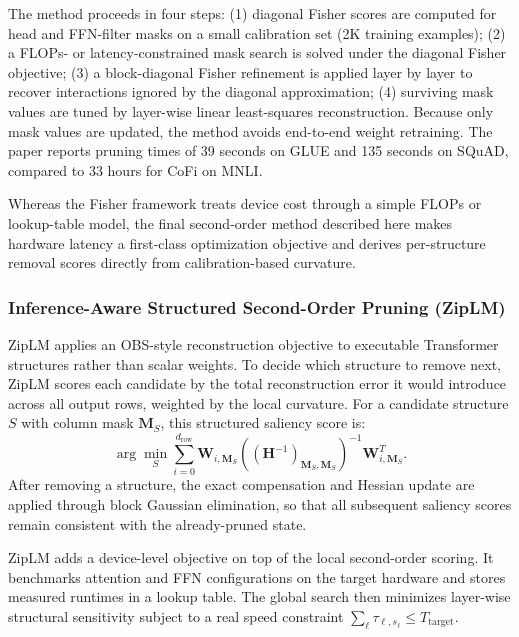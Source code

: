 The method proceeds in four steps: (1) diagonal Fisher scores are computed for head and FFN-filter masks on a small calibration set (2K training examples); (2) a FLOPs- or latency-constrained mask search is solved under the diagonal Fisher objective; (3) a block-diagonal Fisher refinement is applied layer by layer to recover interactions ignored by the diagonal approximation; (4) surviving mask values are tuned by layer-wise linear least-squares reconstruction. Because only mask values are updated, the method avoids end-to-end weight retraining. The paper reports pruning times of 39 seconds on GLUE and 135 seconds on SQuAD, compared to 33 hours for CoFi on MNLI.

Whereas the Fisher framework treats device cost through a simple FLOPs or lookup-table model, the final second-order method described here makes hardware latency a first-class optimization objective and derives per-structure removal scores directly from calibration-based curvature.

\subsubsection{Inference-Aware Structured Second-Order Pruning (ZipLM)}

ZipLM \cite{kurtic2023ziplm} applies an OBS-style reconstruction objective to executable Transformer structures rather than scalar weights. To decide which structure to remove next, ZipLM scores each candidate by the total reconstruction error it would introduce across all output rows, weighted by the local curvature. For a candidate structure $S$ with column mask $\mathbf{M}_S$, this structured saliency score is:
\begin{equation}
	\arg\min_S
	\sum_{i=0}^{d_{\text{row}}}
	\mathbf{W}_{i,\mathbf{M}_S}
	\left(\left(\mathbf{H}^{-1}\right)_{\mathbf{M}_S,\mathbf{M}_S}\right)^{-1}
	\mathbf{W}_{i,\mathbf{M}_S}^{T}.
\end{equation}
After removing a structure, the exact compensation and Hessian update are applied through block Gaussian elimination, so that all subsequent saliency scores remain consistent with the already-pruned state.

ZipLM adds a device-level objective on top of the local second-order scoring. It benchmarks attention and FFN configurations on the target hardware and stores measured runtimes in a lookup table. The global search then minimizes layer-wise structural sensitivity subject to a real speed constraint $\sum_\ell \tau_{\ell,s_\ell} \leq T_{\text{target}}$.


